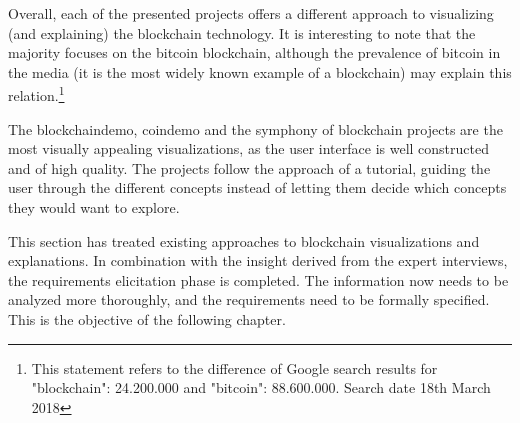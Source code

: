 Overall, each of the presented projects offers a different approach to visualizing (and explaining) the blockchain technology. It is interesting to note that the majority focuses on the bitcoin blockchain, although the prevalence of bitcoin in the media (it is the most widely known example of a blockchain) may explain this relation.\footnote{This statement refers to the difference of Google search results for "blockchain": 24.200.000 and "bitcoin": 88.600.000. Search date 18th March 2018}

The blockchaindemo, coindemo and the symphony of blockchain projects are the most visually appealing visualizations, as the user interface is well constructed and of high quality. The projects follow the approach of a tutorial, guiding the user through the different concepts instead of letting them decide which concepts they would want to explore.

This section has treated existing approaches to blockchain visualizations and explanations. In combination with the insight derived from the expert interviews, the requirements elicitation phase is completed. The information now needs to be analyzed more thoroughly, and the requirements need to be formally specified. This is the objective of the following chapter.